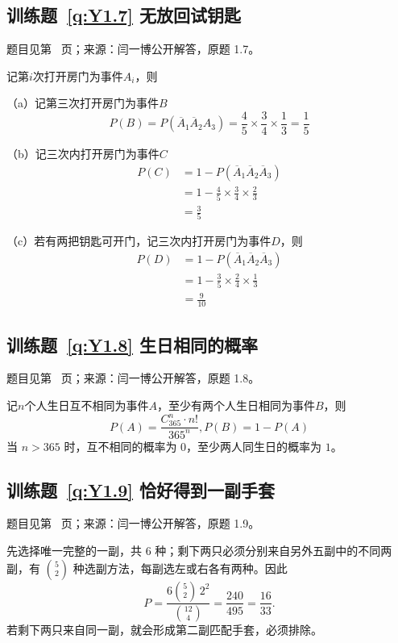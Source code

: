 \documentclass[UTF8,12pt,a4paper,fontset=fandol]{ctexbook}
\begin{document}
\subsection*{训练题~\ref{q:Y1.7} 无放回试钥匙}\label{a:Y1.7}{\small 题目见第~\pageref{q:Y1.7} 页；来源：闫一博公开解答，原题 1.7。}
\begin{solve}
记第$i$次打开房门为事件$A_i$，则

（a）记第三次打开房门为事件$B$
\[P(B)=P({\overline A _1}{\overline A _2}{A_3}) = \frac{4}{5} \times \frac{3}{4} \times \frac{1}{3} = \frac{1}{5}\]

（b）记三次内打开房门为事件$C$
\[\begin{aligned}P(C) &= 1 - P({\overline A _1}{\overline A _2}{\overline A _3}) \\&= 1 - \frac{4}{5} \times \frac{3}{4} \times \frac{2}{3} \\&= \frac{3}{5}\end{aligned}\]

（c）若有两把钥匙可开门，记三次内打开房门为事件$D$，则
\[\begin{aligned}P(D) &= 1 - P({\overline A _1}{\overline A _2}{\overline A _3}) \\&= 1 - \frac{3}{5} \times \frac{2}{4} \times \frac{1}{3} \\&= \frac{9}{{10}}\end{aligned}\]
\end{solve}

\subsection*{训练题~\ref{q:Y1.8} 生日相同的概率}\label{a:Y1.8}{\small 题目见第~\pageref{q:Y1.8} 页；来源：闫一博公开解答，原题 1.8。}
\begin{solve}
记$n$个人生日互不相同为事件$A$，至少有两个人生日相同为事件$B$，则
\[P(A) = \frac{{C_{365}^n}\cdot n!}{{{{365}^n}}},P(B) = 1 - P(A)\]
 当 $n>365$ 时，互不相同的概率为 $0$，至少两人同生日的概率为 $1$。\end{solve}

\subsection*{训练题~\ref{q:Y1.9} 恰好得到一副手套}\label{a:Y1.9}{\small 题目见第~\pageref{q:Y1.9} 页；来源：闫一博公开解答，原题 1.9。}
\begin{solve}先选择唯一完整的一副，共 $6$ 种；剩下两只必须分别来自另外五副中的不同两副，有 $\binom52$ 种选副方法，每副选左或右各有两种。因此\[P=\frac{6\binom52\,2^2}{\binom{12}4}=\frac{240}{495}=\frac{16}{33}.\]若剩下两只来自同一副，就会形成第二副匹配手套，必须排除。\end{solve}
\end{document}
